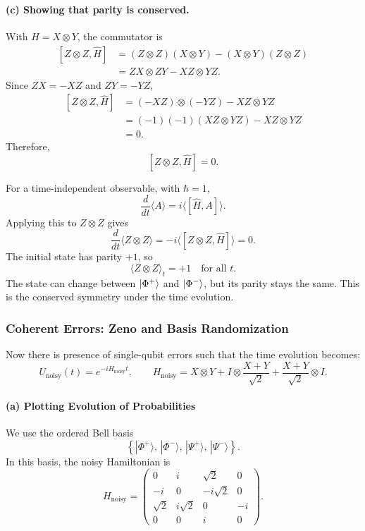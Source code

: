 \documentclass[11pt]{article}
\begin{document}
\paragraph{(c) Showing that parity is conserved.}
With $\hat{H}=X\otimes Y$, the commutator is
\[
\begin{aligned}
[Z\otimes Z,\hat{H}]
&=(Z\otimes Z)(X\otimes Y)
 -(X\otimes Y)(Z\otimes Z)\\
&=ZX\otimes ZY-XZ\otimes YZ.
\end{aligned}
\]
Since $ZX=-XZ$ and $ZY=-YZ$,
\[
\begin{aligned}
[Z\otimes Z,\hat{H}]
&=(-XZ)\otimes(-YZ)-XZ\otimes YZ\\
&=(-1)(-1)(XZ\otimes YZ)-XZ\otimes YZ\\
&=0.
\end{aligned}
\]
Therefore,
\[
\boxed{[Z\otimes Z,\hat{H}]=0.}
\]

For a time-independent observable, with $\hbar=1$,
\[
\frac{d}{dt}\langle A\rangle
=
i\langle[\hat{H},A]\rangle.
\]
Applying this to $Z\otimes Z$ gives
\[
\frac{d}{dt}\langle Z\otimes Z\rangle
=
-i\langle[Z\otimes Z,\hat{H}]\rangle
=0.
\]
The initial state has parity $+1$, so
\[
\boxed{\langle Z\otimes Z\rangle_t=+1
\quad\text{for all }t.}
\]
The state can change between $\ket{\Phi^+}$ and
$\ket{\Phi^-}$, but its parity stays the same.
This is the conserved symmetry under the time evolution.



\setcounter{subsubsection}{2}
\subsubsection{Coherent Errors: Zeno and Basis Randomization}

Now there is presence of single-qubit errors such that the time evolution becomes:
\[
U_{\mathrm{noisy}}(t)
=
e^{-iH_{\mathrm{noisy}}t},
\qquad
H_{\mathrm{noisy}}
=
X\otimes Y
+
I\otimes\frac{X+Y}{\sqrt{2}}
+
\frac{X+Y}{\sqrt{2}}\otimes I.
\]

\paragraph{(a) Plotting Evolution of Probabilities}

We use the ordered Bell basis
\[
\left\{
|\Phi^+\rangle,\,
|\Phi^-\rangle,\,
|\Psi^+\rangle,\,
|\Psi^-\rangle
\right\}.
\]
In this basis, the noisy Hamiltonian is
\[
H_{\mathrm{noisy}}
=
\begin{pmatrix}
0 & i & \sqrt{2} & 0 \\
-i & 0 & -i\sqrt{2} & 0 \\
\sqrt{2} & i\sqrt{2} & 0 & -i \\
0 & 0 & i & 0
\end{pmatrix}.
\]
\end{document}
